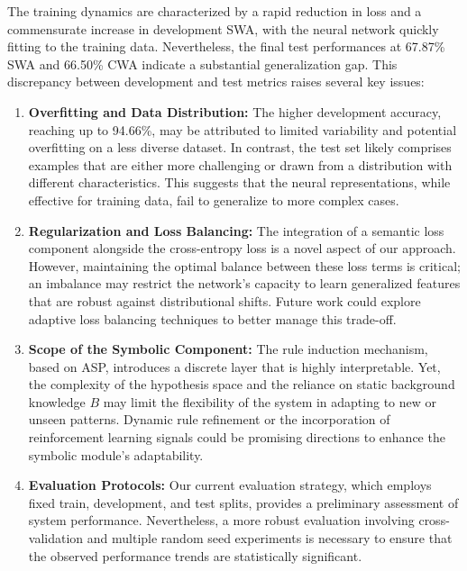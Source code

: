 \documentclass{article}
\begin{document}
The training dynamics are characterized by a rapid reduction in loss and a commensurate increase in development SWA, with the neural network quickly fitting to the training data. Nevertheless, the final test performances at 67.87\% SWA and 66.50\% CWA indicate a substantial generalization gap. This discrepancy between development and test metrics raises several key issues:

\begin{enumerate}
    \item \textbf{Overfitting and Data Distribution:} The higher development accuracy, reaching up to 94.66\%, may be attributed to limited variability and potential overfitting on a less diverse dataset. In contrast, the test set likely comprises examples that are either more challenging or drawn from a distribution with different characteristics. This suggests that the neural representations, while effective for training data, fail to generalize to more complex cases.
    \item \textbf{Regularization and Loss Balancing:} The integration of a semantic loss component alongside the cross-entropy loss is a novel aspect of our approach. However, maintaining the optimal balance between these loss terms is critical; an imbalance may restrict the network’s capacity to learn generalized features that are robust against distributional shifts. Future work could explore adaptive loss balancing techniques to better manage this trade-off.
    \item \textbf{Scope of the Symbolic Component:} The rule induction mechanism, based on ASP, introduces a discrete layer that is highly interpretable. Yet, the complexity of the hypothesis space and the reliance on static background knowledge \(B\) may limit the flexibility of the system in adapting to new or unseen patterns. Dynamic rule refinement or the incorporation of reinforcement learning signals could be promising directions to enhance the symbolic module's adaptability.
    \item \textbf{Evaluation Protocols:} Our current evaluation strategy, which employs fixed train, development, and test splits, provides a preliminary assessment of system performance. Nevertheless, a more robust evaluation involving cross-validation and multiple random seed experiments is necessary to ensure that the observed performance trends are statistically significant.
\end{enumerate}
\end{document}
